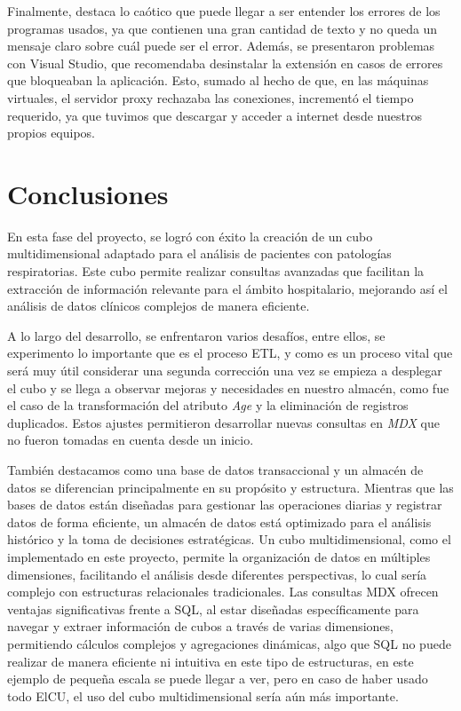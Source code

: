 \documentclass[12pt, a4paper, twoside]{article}
\begin{document}
	Finalmente, destaca lo caótico que puede llegar a ser entender los errores de los programas usados, ya que contienen una gran cantidad de texto y no queda un mensaje claro sobre cuál puede ser el error. Además, se presentaron problemas con Visual Studio, que recomendaba desinstalar la extensión en casos de errores que bloqueaban la aplicación. Esto, sumado al hecho de que, en las máquinas virtuales, el servidor proxy rechazaba las conexiones, incrementó el tiempo requerido, ya que tuvimos que descargar y acceder a internet desde nuestros propios equipos.
	

	\section{Conclusiones}
	
	En esta fase del proyecto, se logró con éxito la creación de un cubo multidimensional adaptado para el análisis de pacientes con patologías respiratorias. Este cubo permite realizar consultas avanzadas que facilitan la extracción de información relevante para el ámbito hospitalario, mejorando así el análisis de datos clínicos complejos de manera eficiente.
	
	A lo largo del desarrollo, se enfrentaron varios desafíos, entre ellos, se experimento lo importante que es el proceso ETL, y como es un proceso vital que será muy útil considerar una segunda corrección una vez se empieza a desplegar el cubo y se llega a observar mejoras y necesidades en nuestro almacén, como fue el caso de la transformación del atributo \textit{Age} y la eliminación de registros duplicados. Estos ajustes permitieron desarrollar nuevas consultas en \textit{MDX} que no fueron tomadas en cuenta desde un inicio.
	
	También destacamos como una base de datos transaccional y un almacén de datos se diferencian principalmente en su propósito y estructura. Mientras que las bases de datos están diseñadas para gestionar las operaciones diarias y registrar datos de forma eficiente, un almacén de datos está optimizado para el análisis histórico y la toma de decisiones estratégicas. Un cubo multidimensional, como el implementado en este proyecto, permite la organización de datos en múltiples dimensiones, facilitando el análisis desde diferentes perspectivas, lo cual sería complejo con estructuras relacionales tradicionales. Las consultas MDX ofrecen ventajas significativas frente a SQL, al estar diseñadas específicamente para navegar y extraer información de cubos a través de varias dimensiones, permitiendo cálculos complejos y agregaciones dinámicas, algo que SQL no puede realizar de manera eficiente ni intuitiva en este tipo de estructuras, en este ejemplo de pequeña escala se puede llegar a ver, pero en caso de haber usado todo ElCU, el uso del cubo multidimensional sería aún más importante.
	
\end{document}
